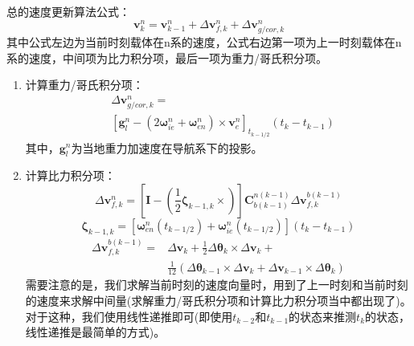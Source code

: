 \documentclass[12pt, twocolumn]{article}
\newcommand{\normf}{\kaishu}
\begin{document}
	\section{\normf{速度更新算法}}
	总的速度更新算法公式：
	\begin{equation*}
		\boldsymbol{v}_k^n=\boldsymbol{v}_{k-1}^n+\Delta\boldsymbol{v}_{f,k}^n+\Delta\boldsymbol{v}_{g/cor,k}^n
	\end{equation*}
	其中公式左边为当前时刻载体在n系的速度，公式右边第一项为上一时刻载体在n系的速度，中间项为比力积分项，最后一项为重力/哥氏积分项。
	\begin{enumerate}
		\item 计算重力/哥氏积分项：
		\begin{equation*}
			\begin{aligned}
			&\Delta\boldsymbol{v}_{g/cor,k}^n=\\&
			[\boldsymbol{g}_l^n-(2\boldsymbol{\omega}_{ie}^n+\boldsymbol{\omega}_{en}^n)\times\boldsymbol{v}_e^n]_{t_{k-1/2}}(t_{k}-t_{k-1})	
			\end{aligned}
		\end{equation*}
	其中，$\boldsymbol{g}_l^n$为当地重力加速度在导航系下的投影。
	\item 计算比力积分项：
	\begin{equation*}
		\Delta\boldsymbol{v}_{f,k}^n=[\boldsymbol{I}-(\frac{1}{2}\boldsymbol{\zeta}_{k-1,k}\times)]\boldsymbol{C}_{b(k-1)}^{n(k-1)}\Delta \boldsymbol{v}_{f,k}^{b(k-1)}
	\end{equation*}
	\begin{equation*}
		\boldsymbol{\zeta}_{k-1,k}=[\boldsymbol{\omega}_{en}^n(t_{k-1/2})+\boldsymbol{\omega}_{ie}^n(t_{k-1/2})](t_k-t_{k-1})
	\end{equation*}
	\begin{equation*}
		\begin{aligned}
				\Delta \boldsymbol{v}_{f,k}^{b(k-1)}=&\Delta\boldsymbol{v}_k+\frac{1}{2}\Delta\boldsymbol{\theta}_k\times\Delta\boldsymbol{v}_k+\\
				&\frac{1}{12}(\Delta\boldsymbol{\theta}_{k-1}\times\Delta\boldsymbol{v}_k+\Delta\boldsymbol{v}_{k-1}\times\Delta\boldsymbol{\theta}_k)
		\end{aligned}
	\end{equation*}
	需要注意的是，我们求解当前时刻的速度向量时，用到了上一时刻和当前时刻的速度来求解中间量(求解重力/哥氏积分项和计算比力积分项当中都出现了)。对于这种，我们使用线性递推即可(即使用$t_{k-2}$和$t_{k-1}$的状态来推测$t_k$的状态，线性递推是最简单的方式)。
	\end{enumerate}
\end{document}
